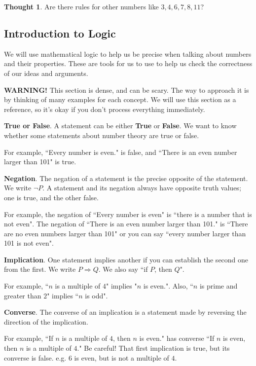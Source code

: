 \documentclass[11pt]{article}
\theoremstyle{definition}
\newtheorem{thought}{Thought}
\numberwithin{thm}{section}
\begin{document}
\begin{thought} Are there rules for other numbers like $3,4,6,7,8,11$?
\end{thought}

\subsection{Introduction to Logic}

We will use mathematical logic to help us be precise when talking about numbers and their properties. These are tools for us to use to help us check the correctness of our ideas and arguments.

\textbf{WARNING!} This section is dense, and can be scary. The way to approach it is by thinking of many examples for each concept. We will use this section as a reference, so it's okay if you don't process everything immediately.

\textbf{True or False}. A statement can be either \textbf{True} or \textbf{False}. We want to know whether some statements about number theory are true or false. 

For example, ``Every number is even." is false, and ``There is an even number larger than 101" is true.

\textbf{Negation}. The negation of a statement is the precise opposite of the statement. We write $\neg P$. A statement and its negation always have opposite truth values; one is true, and the other false. 

For example, the negation of ``Every number is even" is ``there is a number that is not even". The negation of ``There is an even number larger than 101." is ``There are no even numbers larger than 101" or you can say ``every number larger than 101 is not even". 

\textbf{Implication}. One statement implies another if you can establish the second one from the first. We write $P \Rightarrow Q$. We also say ``if $P$, then $Q$".

For example, ``$n$ is a multiple of $4$" implies "$n$ is even.". Also, ``$n$ is prime and greater than $2$" implies ``$n$ is odd".

\textbf{Converse}. The converse of an implication is a statement made by reversing the direction of the implication.

For example, ``If $n$ is a multiple of $4$, then $n$ is even." has converse ``If $n$ is even, then $n$ is a multiple of $4$." Be careful! That first implication is true, but its converse is false. e.g. $6$ is even, but is not a multiple of $4$.
\end{document}
